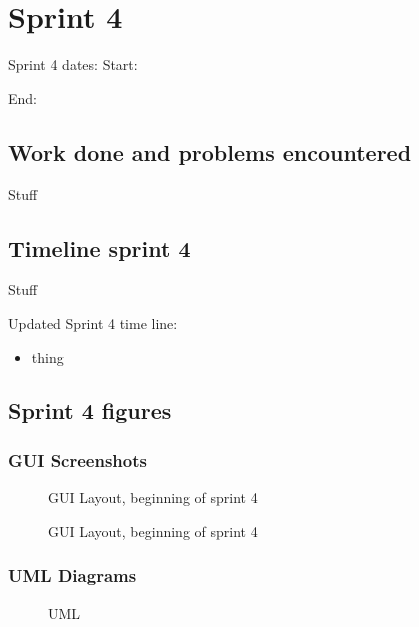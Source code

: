 \documentclass[11pt]{article} %
\begin{document}
{\newpage
\section{Sprint 4}
Sprint 4 dates:  Start: \date{4/20/2017}  End: \date{4/??/2017}

\subsection{Work done and problems encountered}
Stuff

\subsection{Timeline sprint 4}
%
Stuff

\noindent Updated Sprint 4 time line:
\begin{itemize}
	\item thing
\end{itemize}

\newpage
\subsection{Sprint 4 figures}
\subsubsection{GUI Screenshots}

  \begin{figure}[H]
  	\centering
  	\caption{GUI Layout, beginning of sprint 4}
  	\label{fig:GUI Design Start Sprint 3}
  \end{figure}
  
    \begin{figure}[H]
  	\centering
  	\caption{GUI Layout, beginning of sprint 4}
  	\label{fig:GUI Design Start Sprint 3}
  \end{figure}
  
\subsubsection{UML Diagrams}
    \begin{figure}[H]
    	\centering
    	\caption{UML }
    	\label{fig:UML2 }
    \end{figure}
    
}
\end{document}
